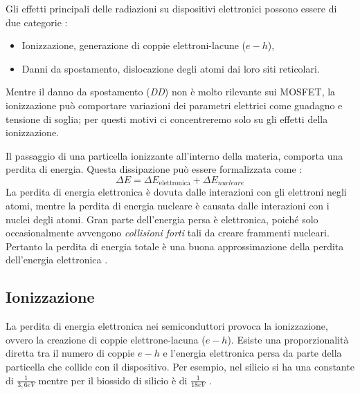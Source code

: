 
Gli effetti principali delle radiazioni su dispositivi elettronici possono essere di due categorie \cite{bib:Effetti_Radiazioni_1987}:
\begin{itemize}
	\item Ionizzazione, generazione di coppie elettroni-lacune ($e-h$),
	\item Danni da spostamento, dislocazione degli atomi dai loro siti reticolari.
\end{itemize}
Mentre il danno da spostamento (\textit{DD}) non è molto rilevante sui MOSFET, la ionizzazione può comportare variazioni dei parametri elettrici come guadagno e tensione di soglia; per questi motivi ci concentreremo solo su gli effetti della ionizzazione.

\vspace{0.5cm}

Il passaggio di una particella ionizzante all'interno della materia, comporta una perdita di energia. Questa dissipazione può essere formalizzata come :
$$ \Delta E = \Delta E_{\text{elettronica}} + \Delta E_{nucleare} $$
La perdita di energia elettronica è dovuta dalle interazioni con gli elettroni negli atomi, mentre la perdita di energia nucleare è causata dalle interazioni con i nuclei degli atomi.
Gran parte dell'energia persa è elettronica, poiché solo occasionalmente avvengono \textit{collisioni forti} tali da creare frammenti nucleari. Pertanto la perdita di energia totale è una buona approssimazione della perdita dell'energia elettronica \cite{bib:Effetti_Radiazioni_NASA}.

\vspace{0.5cm}

\subsection{Ionizzazione}\label{cap1:ionizzazione}
La perdita di energia elettronica  nei semiconduttori provoca la ionizzazione, ovvero la creazione di coppie elettrone-lacuna ($e-h$). Esiste una proporzionalità diretta tra il numero di coppie $e-h$ e l'energia elettronica persa da parte della particella che collide con il dispositivo. Per esempio, nel silicio si ha una constante di $\frac{1}{3,6eV}$ mentre per il biossido di silicio è di $\frac{1}{18eV}$ \cite{bib:Effetti_Radiazioni_NASA}.

